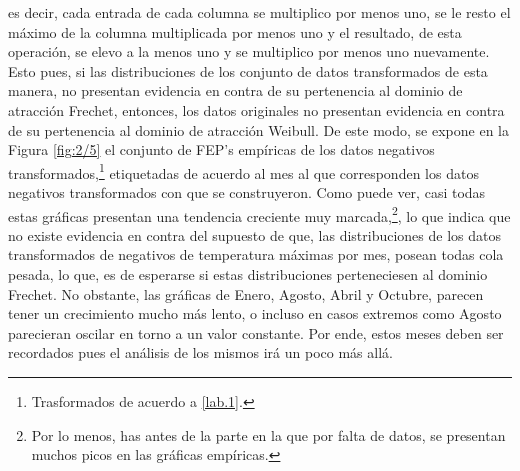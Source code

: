 \documentclass[10.5pt,notitlepage]{article}
\theoremstyle{plain}
\begin{document}
es decir, cada entrada de cada columna se multiplico por menos uno, se le resto el máximo de la columna multiplicada por menos uno y el resultado, de esta operación, se elevo a la menos uno y se multiplico por menos uno nuevamente. Esto pues, si las distribuciones de los conjunto de datos transformados de esta manera, no presentan evidencia en contra de su pertenencia al dominio de atracción Frechet, entonces, los datos originales no presentan evidencia en contra de su pertenencia al dominio de atracción Weibull. De este modo, se expone en la Figura \ref{fig:2/5} el conjunto de FEP's empíricas de los datos negativos transformados,\footnote{Trasformados de acuerdo a \eqref{lab.1}.} etiquetadas de acuerdo al mes al que corresponden los datos negativos transformados con que se construyeron. Como puede ver, casi todas estas gráficas presentan una tendencia creciente muy marcada,\footnote{Por lo menos, has antes de la parte en la que por falta de datos, se presentan muchos picos en las gráficas empíricas.}, lo que indica que no existe evidencia en contra del supuesto de que, las distribuciones de los datos transformados de negativos de temperatura máximas por mes, posean todas cola pesada, lo que, es de esperarse si estas distribuciones perteneciesen al dominio Frechet. No obstante, las gráficas de Enero, Agosto, Abril y Octubre, parecen tener un crecimiento mucho más lento, o incluso en casos extremos como Agosto parecieran oscilar en torno a un valor constante. Por ende, estos meses deben ser recordados pues el análisis de los mismos irá un poco más allá. 
\end{document}
